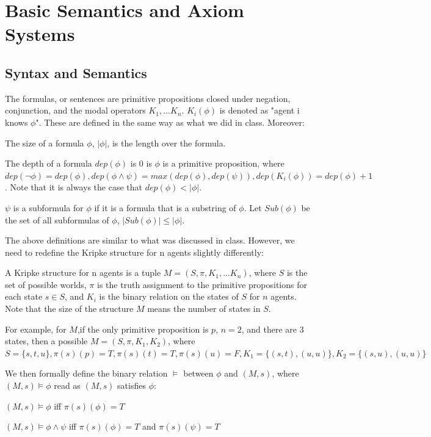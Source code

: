 \documentclass{article}
\begin{document}
\section{Basic Semantics and Axiom Systems}
\subsection{Syntax and Semantics}
\par The formulas, or sentences are primitive propositions closed under negation, conjunction, and the modal operators $K_1,...K_n$. $K_i(\phi)$ is denoted as "agent i knows $\phi$". These are defined in the same way as what we did in class. Moreover:
\par The size of a formula $\phi$, $|\phi|$, is the length over the formula. 
\par The depth of a formula $dep(\phi)$ is 0 is $\phi$ is a primitive proposition, where $dep(\lnot\phi)=dep(\phi),dep(\phi\land\psi)=max(dep(\phi),dep(\psi)),dep(K_i(\phi))=dep(\phi)+1$. Note that it is always the case that $dep(\phi)<|\phi|$.
\par $\psi$ is a subformula for $\phi$ if it is a formula that is a substring of $\phi$. Let $Sub(\phi)$ be the set of all subformulas of $\phi$, $|Sub(\phi)|\leq|\phi|$. \\
\par The above definitions are similar to what was discussed in class. However, we need to redefine the Kripke structure for n agents slightly differently:
\par A Kripke structure for n agents is a tuple $M=(S,\pi,K_1,...K_n)$, where $S$ is the set of possible worlds, $\pi$ is the truth assignment to the primitive propositions for each state $s\in S$, and $K_i$ is the binary relation on the states of $S$ for $n$ agents. Note that the size of the structure $M$ means the number of states in $S$. 
\par For example, for $M$,if the only primitive proposition is $p$, $n=2$, and there are 3 states, then a possible $M=(S,\pi,K_1,K_2)$, where $S=\{s,t,u\},\pi(s)(p)=T, \pi(s)(t)=T, \pi(s)(u)=F,K_1=\{(s,t),(u,u)\},K_2=\{(s,u),(u,u)\}$\\
\par We then formally define the binary relation $\vDash$ between $\phi$ and $(M,s)$, where $(M,s)\vDash\phi$ read as $(M,s)$ satisfies $\phi$: 
\par $(M,s) \vDash \phi$ iff $\pi(s)(\phi)=T$ 
\par $(M,s)\vDash\phi\land\psi$ iff $\pi(s)(\phi)=T$ and $\pi(s)(\psi)=T$
\end{document}
